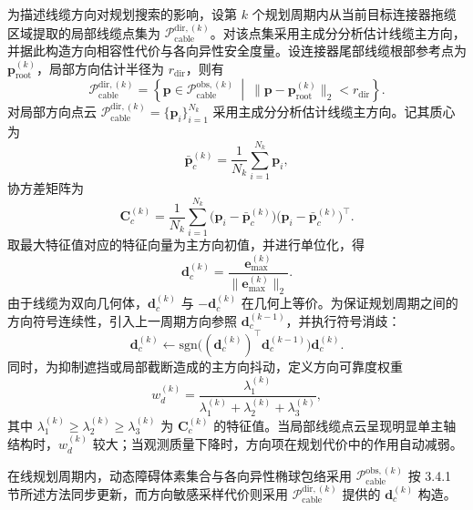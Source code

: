 为描述线缆方向对规划搜索的影响，设第 $k$ 个规划周期内从当前目标连接器拖缆区域提取的局部线缆点集为 $\mathcal{P}_{\mathrm{cable}}^{\mathrm{dir},(k)}$。对该点集采用主成分分析估计线缆主方向，并据此构造方向相容性代价与各向异性安全度量。设连接器尾部线缆根部参考点为 $\mathbf{p}_{\mathrm{root}}^{(k)}$，局部方向估计半径为 $r_{\mathrm{dir}}$，则有
\begin{equation}
  \mathcal{P}_{\mathrm{cable}}^{\mathrm{dir},(k)}=
  \left\{
  \mathbf{p}\in\mathcal{P}_{\mathrm{cable}}^{\mathrm{obs},(k)}
  \ \middle|\
  \|\mathbf{p}-\mathbf{p}_{\mathrm{root}}^{(k)}\|_2<r_{\mathrm{dir}}
  \right\}.
  \label{eq:ch3:cable-dir-cloud}
\end{equation}
对局部方向点云 $\mathcal{P}_{\mathrm{cable}}^{\mathrm{dir},(k)}=\{\mathbf{p}_i\}_{i=1}^{N_k}$ 采用主成分分析估计线缆主方向。记其质心为
\begin{equation}
  \bar{\mathbf{p}}_c^{(k)}=\frac{1}{N_k}\sum_{i=1}^{N_k}\mathbf{p}_i,
\end{equation}
协方差矩阵为
\begin{equation}
  \mathbf{C}_c^{(k)}=\frac{1}{N_k}\sum_{i=1}^{N_k}\bigl(\mathbf{p}_i-\bar{\mathbf{p}}_c^{(k)}\bigr)\bigl(\mathbf{p}_i-\bar{\mathbf{p}}_c^{(k)}\bigr)^\top.
\end{equation}
取最大特征值对应的特征向量为主方向初值，并进行单位化，得
\begin{equation}
  \mathbf{d}_c^{(k)}=\frac{\mathbf{e}_{\max}^{(k)}}{\|\mathbf{e}_{\max}^{(k)}\|_2}.
\end{equation}
由于线缆为双向几何体，$\mathbf{d}_c^{(k)}$ 与 $-\mathbf{d}_c^{(k)}$ 在几何上等价。为保证规划周期之间的方向符号连续性，引入上一周期方向参照 $\mathbf{d}_c^{(k-1)}$，并执行符号消歧：
\begin{equation}
  \mathbf{d}_c^{(k)}\leftarrow
  \mathrm{sgn}\!\bigl((\mathbf{d}_c^{(k)})^\top \mathbf{d}_c^{(k-1)}\bigr)\mathbf{d}_c^{(k)}.
\end{equation}
同时，为抑制遮挡或局部截断造成的主方向抖动，定义方向可靠度权重
\begin{equation}
  w_d^{(k)}=\frac{\lambda_1^{(k)}}{\lambda_1^{(k)}+\lambda_2^{(k)}+\lambda_3^{(k)}},
  \label{eq:ch3:wd}
\end{equation}
其中 $\lambda_1^{(k)}\ge\lambda_2^{(k)}\ge\lambda_3^{(k)}$ 为 $\mathbf{C}_c^{(k)}$ 的特征值。当局部线缆点云呈现明显单主轴结构时，$w_d^{(k)}$ 较大；当观测质量下降时，方向项在规划代价中的作用自动减弱。

在线规划周期内，动态障碍体素集合与各向异性椭球包络采用 $\mathcal{P}_{\mathrm{cable}}^{\mathrm{obs},(k)}$ 按 3.4.1 节所述方法同步更新，而方向敏感采样代价则采用 $\mathcal{P}_{\mathrm{cable}}^{\mathrm{dir},(k)}$ 提供的 $\mathbf{d}_c^{(k)}$ 构造。

